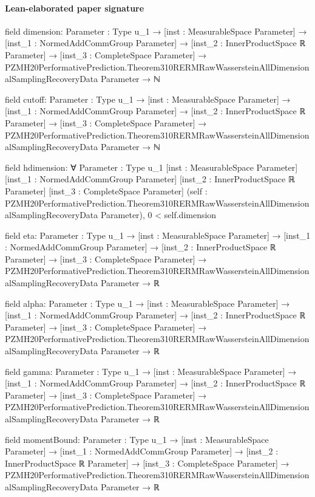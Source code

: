 \documentclass[10pt]{article}
\begin{document}
\paragraph{Lean-elaborated paper signature}
\begin{ReviewVerbatim}
field dimension:
{Parameter : Type u_1} →
  [inst : MeasurableSpace Parameter] →
    [inst_1 : NormedAddCommGroup Parameter] →
      [inst_2 : InnerProductSpace ℝ Parameter] →
        [inst_3 : CompleteSpace Parameter] →
          PZMH20PerformativePrediction.Theorem310RERMRawWassersteinAllDimensionalSamplingRecoveryData Parameter → ℕ

field cutoff:
{Parameter : Type u_1} →
  [inst : MeasurableSpace Parameter] →
    [inst_1 : NormedAddCommGroup Parameter] →
      [inst_2 : InnerProductSpace ℝ Parameter] →
        [inst_3 : CompleteSpace Parameter] →
          PZMH20PerformativePrediction.Theorem310RERMRawWassersteinAllDimensionalSamplingRecoveryData Parameter → ℕ

field hdimension:
∀ {Parameter : Type u_1} [inst : MeasurableSpace Parameter] [inst_1 : NormedAddCommGroup Parameter]
  [inst_2 : InnerProductSpace ℝ Parameter] [inst_3 : CompleteSpace Parameter]
  (self : PZMH20PerformativePrediction.Theorem310RERMRawWassersteinAllDimensionalSamplingRecoveryData Parameter),
  0 < self.dimension

field eta:
{Parameter : Type u_1} →
  [inst : MeasurableSpace Parameter] →
    [inst_1 : NormedAddCommGroup Parameter] →
      [inst_2 : InnerProductSpace ℝ Parameter] →
        [inst_3 : CompleteSpace Parameter] →
          PZMH20PerformativePrediction.Theorem310RERMRawWassersteinAllDimensionalSamplingRecoveryData Parameter → ℝ

field alpha:
{Parameter : Type u_1} →
  [inst : MeasurableSpace Parameter] →
    [inst_1 : NormedAddCommGroup Parameter] →
      [inst_2 : InnerProductSpace ℝ Parameter] →
        [inst_3 : CompleteSpace Parameter] →
          PZMH20PerformativePrediction.Theorem310RERMRawWassersteinAllDimensionalSamplingRecoveryData Parameter → ℝ

field gamma:
{Parameter : Type u_1} →
  [inst : MeasurableSpace Parameter] →
    [inst_1 : NormedAddCommGroup Parameter] →
      [inst_2 : InnerProductSpace ℝ Parameter] →
        [inst_3 : CompleteSpace Parameter] →
          PZMH20PerformativePrediction.Theorem310RERMRawWassersteinAllDimensionalSamplingRecoveryData Parameter → ℝ

field momentBound:
{Parameter : Type u_1} →
  [inst : MeasurableSpace Parameter] →
    [inst_1 : NormedAddCommGroup Parameter] →
      [inst_2 : InnerProductSpace ℝ Parameter] →
        [inst_3 : CompleteSpace Parameter] →
          PZMH20PerformativePrediction.Theorem310RERMRawWassersteinAllDimensionalSamplingRecoveryData Parameter → ℝ


\end{ReviewVerbatim}
\end{document}
